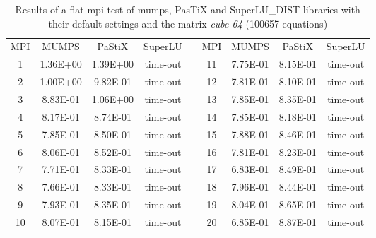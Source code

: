 \begin{table}[ht]
\centering
\begin{tabular}{|c|c|c|c|l|c|c|c|c|}
\cline{1-4} \cline{6-9}
MPI & MUMPS    & PaStiX   & SuperLU  &  & MPI & MUMPS    & PaStiX   & SuperLU  \\ \cline{1-4} \cline{6-9} 
1   & 1.36E+00 & 1.39E+00 & time-out &  & 11  & 7.75E-01 & 8.15E-01 & time-out \\ \cline{1-4} \cline{6-9} 
2   & 1.00E+00 & 9.82E-01 & time-out &  & 12  & 7.81E-01 & 8.10E-01 & time-out \\ \cline{1-4} \cline{6-9} 
3   & 8.83E-01 & 1.06E+00 & time-out &  & 13  & 7.85E-01 & 8.35E-01 & time-out \\ \cline{1-4} \cline{6-9} 
4   & 8.17E-01 & 8.74E-01 & time-out &  & 14  & 7.85E-01 & 8.18E-01 & time-out \\ \cline{1-4} \cline{6-9} 
5   & 7.85E-01 & 8.50E-01 & time-out &  & 15  & 7.88E-01 & 8.46E-01 & time-out \\ \cline{1-4} \cline{6-9} 
6   & 8.06E-01 & 8.52E-01 & time-out &  & 16  & 7.81E-01 & 8.23E-01 & time-out \\ \cline{1-4} \cline{6-9} 
7   & 7.71E-01 & 8.33E-01 & time-out &  & 17  & 6.83E-01 & 8.49E-01 & time-out \\ \cline{1-4} \cline{6-9} 
8   & 7.66E-01 & 8.33E-01 & time-out &  & 18  & 7.96E-01 & 8.44E-01 & time-out \\ \cline{1-4} \cline{6-9} 
9   & 7.93E-01 & 8.35E-01 & time-out &  & 19  & 8.04E-01 & 8.65E-01 & time-out \\ \cline{1-4} \cline{6-9} 
10  & 8.07E-01 & 8.15E-01 & time-out &  & 20  & 6.85E-01 & 8.87E-01 & time-out \\ \cline{1-4} \cline{6-9} 
\end{tabular}
\caption{Results of a flat-\gls{mpi} test of \gls{mumps}, PasTiX and SuperLU\_DIST libraries with their default settings and the matrix \textit{cube-64} (100657 equations)}
\label{table:lc-cube-64-result}
\end{table}


